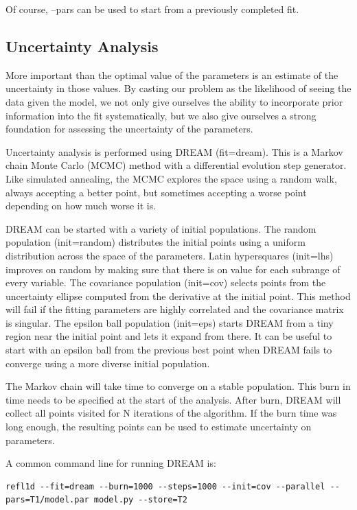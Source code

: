 \documentclass[letterpaper,10pt,english]{sphinxmanual}
\begin{document}
Of course, --pars can be used to start from a previously completed fit.


\subsection{Uncertainty Analysis}
\label{guide/fitting:uncertainty-analysis}
More important than the optimal value of the parameters is an estimate
of the uncertainty in those values.  By casting our problem as the
likelihood of seeing the data given the model, we not only give
ourselves the ability to incorporate prior information into the fit
systematically, but we also give ourselves a strong foundation for
assessing the uncertainty of the parameters.

Uncertainty analysis is performed using DREAM (fit=dream).  This is a
Markov chain Monte Carlo (MCMC) method with a differential evolution
step generator.  Like simulated annealing, the MCMC explores the space
using a random walk, always accepting a better point, but sometimes
accepting a worse point depending on how much worse it is.

DREAM can be started with a variety of initial populations.  The
random population (init=random) distributes the initial points using
a uniform distribution across the space of the parameters.  Latin
hypersquares (init=lhs) improves on random by making sure that
there is on value for each subrange of every variable. The covariance
population (init=cov) selects points from the uncertainty ellipse
computed from the derivative at the initial point.  This method
will fail if the fitting parameters are highly correlated and the
covariance matrix is singular.  The epsilon ball population (init=eps)
starts DREAM from a tiny region near the initial point and lets it
expand from there.  It can be useful to start with an epsilon ball
from the previous best point when DREAM fails to converge using
a more diverse initial population.

The Markov chain will take time to converge on a stable population.
This burn in time needs to be specified at the start of the analysis.
After burn, DREAM will collect all points visited for N iterations
of the algorithm.  If the burn time was long enough, the resulting
points can be used to estimate uncertainty on parameters.

A common command line for running DREAM is:

\begin{Verbatim}[commandchars=@\[\]]
refl1d --fit=dream --burn=1000 --steps=1000 --init=cov --parallel --pars=T1/model.par model.py --store=T2
\end{Verbatim}
\end{document}
